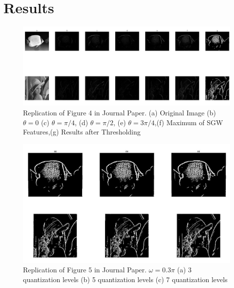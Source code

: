 \documentclass[./rarnold_final_project.tex]{subfiles}
\begin{document}
\clearpage

\section{Results}

	\begin{figure}[!htbp]
	\centering
	\includegraphics[scale=0.35]{"angles"}
	\captionsetup{justification=centering}
	\caption{Replication of Figure 4 in Journal Paper. (a) Original Image (b) $\theta=0$ (c) $\theta=\pi/4$, (d) $\theta=\pi/2$, (e) $\theta=3\pi/4$,(f) Maximum of SGW Features,(g) Results after Thresholding \cite{main}} 
	\label{angles}
	\end{figure}
	
	
	\begin{figure}[!htbp]
	\centering
	\includegraphics[scale=0.35]{"level_freq1"}
	\captionsetup{justification=centering}
	\caption{Replication of Figure 5 in Journal Paper. $\omega=0.3\pi$ (a) 3 quantization levels (b) 5 quantization levels (c) 7 quantization levels \cite{main}} 
	\label{level_freq1}
	\end{figure}
	
	\clearpage
	
\end{document}
